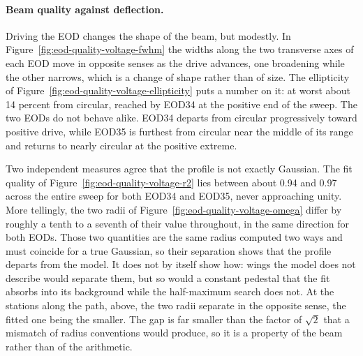 \documentclass{article}
\begin{document}
\paragraph{Beam quality against deflection.}
Driving the EOD changes the shape of the beam, but modestly. In
Figure~\ref{fig:eod-quality-voltage-fwhm} the widths along the two transverse axes of each
EOD move in opposite senses as the drive advances, one broadening while the other narrows,
which is a change of shape rather than of size. The ellipticity of
Figure~\ref{fig:eod-quality-voltage-ellipticity} puts a number on it: at worst about 14 percent
from circular, reached by EOD34 at the positive end of the sweep. The two EODs do not
behave alike. EOD34 departs from circular progressively toward positive drive, while EOD35 is
furthest from circular near the middle of its range and returns to nearly circular at the
positive extreme.

Two independent measures agree that the profile is not exactly Gaussian. The fit quality of
Figure~\ref{fig:eod-quality-voltage-r2} lies between about 0.94 and 0.97 across the entire sweep
for both EOD34 and EOD35, never approaching unity. More tellingly, the two radii of
Figure~\ref{fig:eod-quality-voltage-omega} differ by roughly a tenth to a seventh of their value
throughout, in the same direction for both EODs. Those two quantities are the same radius
computed two ways and must coincide for a true Gaussian, so their separation shows that the
profile departs from the model. It does not by itself show how: wings the model does not
describe would separate them, but so would a constant pedestal that the fit absorbs into its
background while the half-maximum search does not. At the stations along the path, above, the two
radii separate in the opposite sense, the fitted one being the smaller. The gap is far smaller than the factor of $\sqrt{2}$ that a
mismatch of radius conventions would produce, so it is a property of the beam rather than of the
arithmetic.
\end{document}
